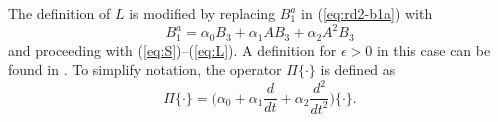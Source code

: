 The definition of $L$ is modified by replacing $B_1^a$ in (\ref{eq:rd2-b1a}) with
\begin{equation}
B_1^a = \alpha_0 B_3 + \alpha_1 A B_3 + \alpha_2 A^2 B_3 \label{eq:rd3-b1a}
\end{equation}
and proceeding with (\ref{eq:S})--(\ref{eq:L}). A definition for $\epsilon>0$ in this case can be found in \cite{qu2016phd}. To simplify notation, the operator $\Pi \{\cdot \}$ is defined as
\begin{equation}
\Pi \{ \cdot \} = \big( \alpha_0 + \alpha_1 \frac{d}{dt} + \alpha_2 \frac{d^2}{dt^2} \big) \{ \cdot \}.
\end{equation}

